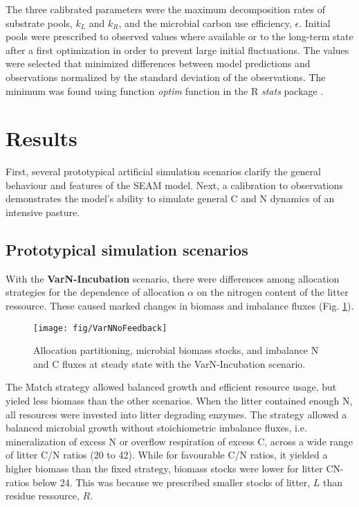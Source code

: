 The three calibrated parameters were the maximum decomposition rates of
substrate pools, $k_L$ and $k_R$, and the microbial carbon use efficiency,
$\epsilon$. Initial pools were prescribed to observed values where available or
to the long-term state after a first optimization in order to prevent large
initial fluctuations. The values were selected that minimized differences
between model predictions and observations normalized by the standard deviation
of the observations. The minimum was found using function \textit{optim}
function in the R \textit{stats} package \citep{R07}.
 
\section{Results}

First, several prototypical artificial simulation scenarios clarify the
general behaviour and features of the SEAM model. Next, a calibration to
observations demonstrates the model's ability to simulate general C and N
dynamics of an intensive pasture.

\subsection{Prototypical simulation scenarios}

With the \textbf{VarN-Incubation} scenario, there were differences among
allocation strategies for the dependence of allocation $\alpha$ on the nitrogen
content of the litter ressource. These caused marked changes in
biomass and imbalance fluxes (Fig.
\ref{fig:VarNNoFeedback}).

\begin{figure}[t]
\vspace*{2mm}
\begin{center}
\texttt{[image: fig/VarNNoFeedback]}
\end{center}
\caption{Allocation partitioning,
microbial biomass stocks, and imbalance N and C
fluxes at steady state with the VarN-Incubation scenario.
\label{fig:VarNNoFeedback}}
\end{figure}

The Match strategy allowed balanced growth and efficient resource usage, but
yieled less biomass than the other scenarios. When the litter contained enough
N, all resources were invested into litter degrading enzymes. The strategy
allowed a balanced microbial growth without stoichiometric imbalance fluxes,
i.e. mineralization of excess N or overflow respiration of excess C, across a
wide range of litter C/N ratios (20 to 42). While for favourable C/N ratios, it
yielded a higher biomass than the fixed strategy, biomass stocks were lower for
litter CN-ratios below 24. This was because we prescribed smaller stocks of
litter, $L$ than residue ressource, $R$. 


